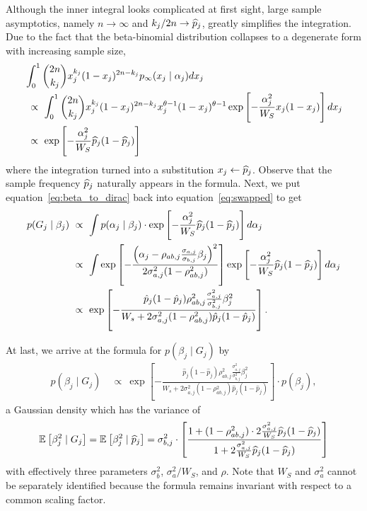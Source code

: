 \documentclass[10pt]{article}
\begin{document}
Although the inner integral looks complicated at first sight, 
large sample asymptotics, namely $n \rightarrow \infty$ and $k_j/2n \rightarrow \widehat{p}_j$, greatly simplifies the integration.
Due to the fact that the beta-binomial distribution collapses to a degenerate form with increasing sample size,
\begin{align} \label{eq:beta_to_dirac}
    \begin{aligned}
        & \int_0^1 
        \binom{2n}{k_j} 
        x_j^{k_j}(1-x_j)^{2n-k_j}
        p_{\infty}(x_j \mid \alpha_j) 
        dx_j \\
        & \ \propto \ \int_0^1   
        \binom{2n}{k_j} 
        x_j^{k_j}(1-x_j)^{2n-k_j}
        x_j^{\theta-1}(1-x_j)^{\theta-1}
        \exp\left[-\frac{\alpha_j^2}{W_S}x_j(1-x_j) \right]dx_j \\
        &\ \propto \ \exp\left[-\frac{\alpha_j^2}{W_S}\widehat{p}_j(1-\widehat{p}_j) \right]
    \end{aligned}
\end{align}
where the integration turned into a substitution $x_j \leftarrow \widehat{p}_j$.
Observe that the sample frequency $\widehat{p}_j$ naturally appears in the formula.
Next, we put equation~\ref{eq:beta_to_dirac} back into equation~\ref{eq:swapped} to get
\begin{align}
    \begin{aligned}
        p(G_j \mid \beta_j) 
        &\ \propto \
        \int p(\alpha_j \mid \beta_j) \cdot 
        \exp\left[-\frac{\alpha_j^2}{W_S}\widehat{p}_j(1-\widehat{p}_j) \right] d\alpha_j \\
        & \ \propto \ \int
        \exp \left[ -\frac{\left( \alpha_j - \rho_{ab,j} \frac{\sigma_{a,j}}{\sigma_{b,j}} \beta_j \right)^2}{2 \sigma_{a,j}^2 (1 - \rho_{ab,j}^2)} \right]
        \exp\left[-\frac{\alpha_j^2}{W_S}\widehat{p}_j(1-\widehat{p}_j) \right] d\alpha_j 
        \\
        & \ \propto \
        \exp \left[ -\frac{\hat{p}_j(1 - \hat{p}_j) \rho_{ab,j}^2 \frac{\sigma_{a,j}^2}{\sigma_{b,j}^2} \beta_j^2}{W_s + 2\sigma_{a,j}^2(1 - \rho_{ab,j}^2)\hat{p}_j(1 - \hat{p}_j)} \right].
    \end{aligned}
\end{align}

At last, we arrive at the formula for $p(\beta_j \mid G_j)$ by
\begin{align}
    p(\beta_j \mid G_j) &\ \propto \ 
    \exp \left[ -\frac{\hat{p}_j(1 - \hat{p}_j) \rho_{ab,j}^2 \frac{\sigma_{a,j}^2}{\sigma_{b,j}^2} \beta_j^2}{W_s + 2\sigma_{a,j}^2(1 - \rho_{ab,j}^2)\hat{p}_j(1 - \hat{p}_j)} \right] \cdot p(\beta_j), 
\end{align}
a Gaussian density which has the variance of
\begin{align} \label{eq:beta_cond_var}
    \mathbb{E}_{}\left[\beta_j^2 \mid G_j\right] = \mathbb{E}_{}\left[\beta_j^2 \mid \widehat{p}_j\right] = 
    \sigma_{b,j}^2 \cdot 
    \left[
        \frac{
            1 + (1-\rho_{ab,j}^2) \cdot 2\frac{\sigma_{a,j}^2}{W_S} \widehat{p}_j(1-\widehat{p}_j)}{
            1 + 2\frac{\sigma_{a,j}^2}{W_S} \widehat{p}_j(1-\widehat{p}_j) 
        }
    \right]
\end{align}
with effectively three parameters $\sigma_b^2$, $\sigma_a^2 / W_S$, and $\rho$.
Note that $W_S$ and $\sigma_a^2$ cannot be separately identified because the formula remains invariant with respect to a common scaling factor.
\end{document}
